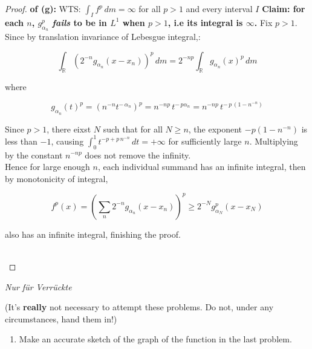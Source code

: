 \begin{proof}

\textbf{of (g):} WTS: \(\int_{I}f^{p}\, dm = \infty\) for all \(p > 1\) and every interval \(I\) \textbf{Claim: for each \(n\), \(g_{\alpha_{n}}^{p}\) \emph{fails} to be in \(L^{1}\) when \(p > 1\), i.e its integral is \(\infty\).} Fix \(p > 1\).\\
Since by translation invariance of Lebesgue integral,:

\[\int_{\mathbb{R}}(2^{- n}g_{\alpha_{n}}(x - x_{n}))^{p}\, dm = 2^{- np}\int_{\mathbb{R}}g_{\alpha_{n}}(x)^{p}\, dm\]

where

\[g_{\alpha_{n}}(t)^{p} = (n^{- n}t^{- \,\alpha_{n}})^{p} = n^{- np}\, t^{- \, p\alpha_{n}} = n^{- np}\, t^{- \, p\,(1 - n^{- n})}\]

Since \(p > 1\), there eixst \(N\) such that for all \(N \geq n\), the exponent \(- p(1 - n^{- n})\) is less than \(- 1\), causing \(\int_{0}^{1}t^{- p + p\, n^{- n}}\, dt = + \infty\) for sufficiently large \(n\). Multiplying by the constant \(n^{- np}\) does not remove the infinity.\\
Hence for large enough \(n\), each individual summand has an infinite integral, then by monotonicity of integral,

\[f^{p}(x) = (\sum\limits_{n}2^{- n}g_{\alpha_{n}}(x - x_{n}))^{p} \geq 2^{- N}g_{\alpha_{N}}^{p}(x - x_{N})\]

also has an infinite integral, finishing the proof.\\
\strut \\

\end{proof}

\emph{Nur für Verrückte}

(It's \textbf{really} not necessary to attempt these problems. Do not, under any circumstances, hand them in!)

\begin{enumerate}
\tightlist
\item
  Make an accurate sketch of the graph of the function in the last problem.
\end{enumerate}
